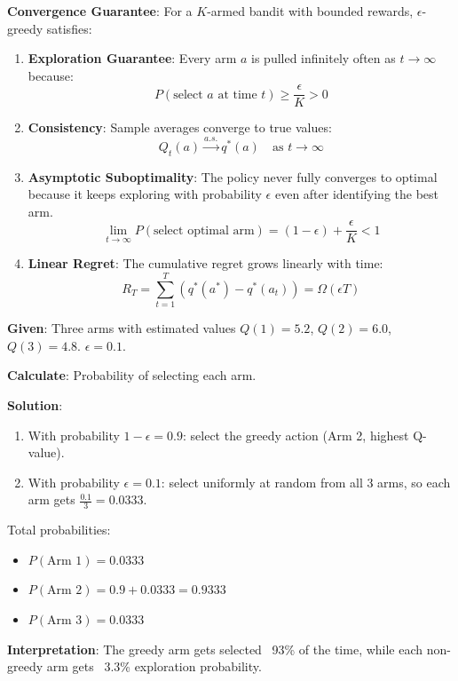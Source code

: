 \documentclass[11pt,a4paper]{article}
\begin{document}
\begin{tcolorbox}[colback=yellow!5!white,colframe=yellow!75!black,title=\textbf{Theoretical Analysis of $\epsilon$-Greedy Convergence}]
\textbf{Convergence Guarantee}: For a $K$-armed bandit with bounded rewards, $\epsilon$-greedy satisfies:

\begin{enumerate}
    \item \textbf{Exploration Guarantee}: Every arm $a$ is pulled infinitely often as $t \to \infty$ because:
    \[
    P(\text{select } a \text{ at time } t) \geq \frac{\epsilon}{K} > 0
    \]
    
    \item \textbf{Consistency}: Sample averages converge to true values:
    \[
    Q_t(a) \xrightarrow{a.s.} q^*(a) \quad \text{as } t \to \infty
    \]
    
    \item \textbf{Asymptotic Suboptimality}: The policy never fully converges to optimal because it keeps exploring with probability $\epsilon$ even after identifying the best arm.
    \[
    \lim_{t \to \infty} P(\text{select optimal arm}) = (1-\epsilon) + \frac{\epsilon}{K} < 1
    \]
    
    \item \textbf{Linear Regret}: The cumulative regret grows linearly with time:
    \[
    R_T = \sum_{t=1}^T (q^*(a^*) - q^*(a_t)) = \Omega(\epsilon T)
    \]
\end{enumerate}
\end{tcolorbox}

\begin{tcolorbox}[colback=blue!5!white,colframe=blue!75!black,title=\textbf{Worked Example 4: Epsilon-Greedy Action Selection}]
\textbf{Given}: Three arms with estimated values $Q(1) = 5.2$, $Q(2) = 6.0$, $Q(3) = 4.8$. $\epsilon = 0.1$.

\textbf{Calculate}: Probability of selecting each arm.

\textbf{Solution}:
\begin{enumerate}
    \item With probability $1 - \epsilon = 0.9$: select the greedy action (Arm 2, highest Q-value).
    \item With probability $\epsilon = 0.1$: select uniformly at random from all 3 arms, so each arm gets $\frac{0.1}{3} = 0.0333$.
\end{enumerate}

Total probabilities:
\begin{itemize}
    \item $P(\text{Arm 1}) = 0.0333$
    \item $P(\text{Arm 2}) = 0.9 + 0.0333 = 0.9333$
    \item $P(\text{Arm 3}) = 0.0333$
\end{itemize}

\textbf{Interpretation}: The greedy arm gets selected ~93\% of the time, while each non-greedy arm gets ~3.3\% exploration probability.
\end{tcolorbox}
\end{document}
